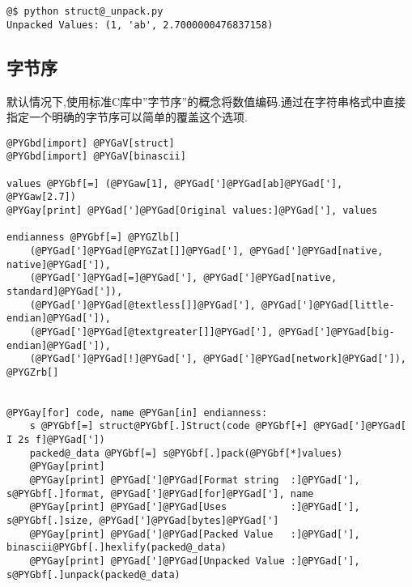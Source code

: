 \documentclass[letterpaper,10pt,english]{manual}
\begin{document}
\begin{Verbatim}[commandchars=@\[\]]
@$ python struct@_unpack.py
Unpacked Values: (1, 'ab', 2.7000000476837158)
\end{Verbatim}


\subsection{字节序}

默认情况下,使用标准C库中''字节序''的概念将数值编码.通过在字符串格式中直接指定一个明确的字节序可以简单的覆盖这个选项.

\begin{Verbatim}[commandchars=@\[\]]
@PYGbd[import] @PYGaV[struct]
@PYGbd[import] @PYGaV[binascii]

values @PYGbf[=] (@PYGaw[1], @PYGad[']@PYGad[ab]@PYGad['], @PYGaw[2.7])
@PYGay[print] @PYGad[']@PYGad[Original values:]@PYGad['], values

endianness @PYGbf[=] @PYGZlb[]
    (@PYGad[']@PYGad[@PYGZat[]]@PYGad['], @PYGad[']@PYGad[native, native]@PYGad[']),
    (@PYGad[']@PYGad[=]@PYGad['], @PYGad[']@PYGad[native, standard]@PYGad[']),
    (@PYGad[']@PYGad[@textless[]]@PYGad['], @PYGad[']@PYGad[little-endian]@PYGad[']),
    (@PYGad[']@PYGad[@textgreater[]]@PYGad['], @PYGad[']@PYGad[big-endian]@PYGad[']),
    (@PYGad[']@PYGad[!]@PYGad['], @PYGad[']@PYGad[network]@PYGad[']),
@PYGZrb[]


@PYGay[for] code, name @PYGan[in] endianness:
    s @PYGbf[=] struct@PYGbf[.]Struct(code @PYGbf[+] @PYGad[']@PYGad[ I 2s f]@PYGad['])
    packed@_data @PYGbf[=] s@PYGbf[.]pack(@PYGbf[*]values)
    @PYGay[print]
    @PYGay[print] @PYGad[']@PYGad[Format string  :]@PYGad['], s@PYGbf[.]format, @PYGad[']@PYGad[for]@PYGad['], name
    @PYGay[print] @PYGad[']@PYGad[Uses           :]@PYGad['], s@PYGbf[.]size, @PYGad[']@PYGad[bytes]@PYGad[']
    @PYGay[print] @PYGad[']@PYGad[Packed Value   :]@PYGad['], binascii@PYGbf[.]hexlify(packed@_data)
    @PYGay[print] @PYGad[']@PYGad[Unpacked Value :]@PYGad['], s@PYGbf[.]unpack(packed@_data)
\end{Verbatim}
\end{document}
